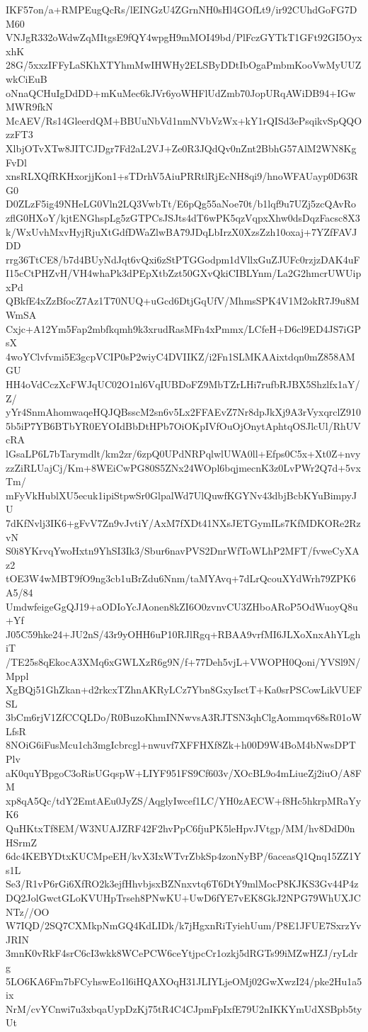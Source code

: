 IKF57on/a+RMPEugQcRs/lEINGzU4ZGrnNH0sHl4GOfLt9/ir92CUhdGoFG7DM60
VNJgR332oWdwZqMItgsE9fQY4wpgH9mMOI49bd/PlFczGYTkT1GFt92GI5OyxxhK
28G/5xxzIFFyLaSKhXTYhmMwIHWHy2ELSByDDtIbOgaPmbmKooVwMyUUZwkCiEuB
oNnaQCHuIgDdDD+mKuMec6kJVr6yoWHFlUdZmb70JopURqAWiDB94+IGwMWR9fkN
McAEV/Rs14GleerdQM+BBUuNbVd1nmNVbVzWx+kY1rQISd3ePsqikvSpQQOzzFT3
XlbjOTvXTw8JITCJDgr7Fd2aL2VJ+Ze0R3JQdQv0nZnt2BbhG57AlM2WN8KgFvDl
xnsRLXQfRKHxorjjKon1+sTDrhV5AiuPRRtlRjEcNH8qi9/hnoWFAUayp0D63RG0
D0ZLzF5ig49NHeLG0Vln2LQ3VwbTt/E6pQg55aNoe70t/b1lqf9u7UZj5zcQAvRo
zflG0HXoY/kjtENGhspLg5zGTPCsJSJts4dT6wPK5qzVqpxXhw0dsDqzFacsc8X3
k/WxUvhMxvHyjRjuXtGdfDWaZlwBA79JDqLbIrzX0XzsZzh10oxaj+7YZfFAVJDD
rrg36TtCE8/b7d4BUyNdJqt6vQxi6zStPTGGodpm1dVllxGuZJUFc0rzjzDAK4uF
I15cCtPHZvH/VH4whaPk3dPEpXtbZzt50GXvQkiCIBLYnm/La2G2hmcrUWUipxPd
QBkfE4xZzBfocZ7Az1T70NUQ+uGcd6DtjGqUfV/MhmsSPK4V1M2okR7J9u8MWmSA
Cxjc+A12Ym5Fap2mbfkqmh9k3xrudRasMFn4xPmmx/LCfeH+D6cl9ED4JS7iGPsX
4woYClvfvmi5E3gcpVCIP0sP2wiyC4DVIIKZ/i2Fn1SLMKAAixtdqn0mZ858AMGU
HH4oVdCczXcFWJqUC02O1nl6VqIUBDoFZ9MbTZrLHi7rufbRJBX5Shzlfx1aY/Z/
yYr4SnmAhomwaqeHQJQBsscM2sn6v5Lx2FFAEvZ7Nr8dpJkXj9A3rVyxqrclZ910
5b5iP7YB6BTbYR0EYOIdBbDtHPb7OiOKpIVfOuOjOnytAphtqOSJlcUl/RhUVcRA
lGsaLP6L7bTarymdlt/km2zr/6zpQ0UPdNRPqlwlUWA0ll+Efps0C5x+Xt0Z+nvy
zzZiRLUajCj/Km+8WEiCwPG80S5ZNx24WOpl6bqjmecnK3z0LvPWr2Q7d+5vxTm/
mFyVkHublXU5ecuk1ipiStpwSr0GlpalWd7UlQuwfKGYNv43dbjBcbKYuBimpyJU
7dKfNvlj3IK6+gFvV7Zn9vJvtiY/AxM7fXDt41NXsJETGymILs7KfMDKORe2RzvN
S0i8YKrvqYwoHxtn9YhSI3Ik3/Sbur6navPVS2DnrWfToWLhP2MFT/fvweCyXAz2
tOE3W4wMBT9fO9ng3cb1uBrZdu6Nnm/taMYAvq+7dLrQcouXYdWrh79ZPK6A5/84
UmdwfeigeGgQJ19+aODIoYcJAonen8kZI6O0zvnvCU3ZHboARoP5OdWuoyQ8u+Yf
J05C59hke24+JU2nS/43r9yOHH6uP10RJlRgq+RBAA9vrfMI6JLXoXnxAhYLghiT
/TE25s8qEkocA3XMq6xGWLXzR6g9N/f+77Deh5vjL+VWOPH0Qoni/YVSl9N/Mppl
XgBQj51GhZkan+d2rkcxTZhnAKRyLCz7Ybn8GxyIsctT+Ka0srPSCowLikVUEFSL
3bCm6rjV1ZfCCQLDo/R0BuzoKhmINNwvsA3RJTSN3qhClgAommqv68sR01oWLfsR
8NOiG6iFusMcu1ch3mgIcbrcgl+nwuvf7XFFHXf8Zk+h00D9W4BoM4bNwsDPTPlv
aK0quYBpgoC3oRisUGqspW+LIYF951FS9Cf603v/XOcBL9o4mLiueZj2iuO/A8FM
xp8qA5Qc/tdY2EmtAEu0JyZS/AqglyIwcef1LC/YH0zAECW+f8Hc5hkrpMRaYyK6
QuHKtxTf8EM/W3NUAJZRF42F2hvPpC6fjuPK5leHpvJVtgp/MM/hv8DdD0nHSrmZ
6dc4KEBYDtxKUCMpeEH/kvX3IxWTvrZbkSp4zonNyBP/6aceasQ1Qnq15ZZ1Ys1L
Se3/R1vP6rGi6XfRO2k3ejfHhvbjsxBZNnxvtq6T6DtY9mlMocP8KJKS3Gv44P4z
DQ2JolGwctGLoKVUHpTrseh8PNwKU+UwD6fYE7vEK8GkJ2NPG79WhUXJCNTz//OO
W7IQD/2SQ7CXMkpNmGQ4KdLIDk/k7jHgxnRiTyiehUum/P8E1JFUE7SxrzYvJRIN
3mnK0vRkF4srC6cI3wkk8WCePCW6ceYtjpcCr1ozkj5dRGTs99iMZwHZJ/ryLdrg
5LO6KA6Fm7bFCyhswEo1l6iHQAXOqH31JLIYLjeOMj02GwXwzI24/pke2Hu1a5ix
NrM/cvYCnwi7u3xbqaUypDzKj75tR4C4CJpmFpIxfE79U2nIKKYmUdXSBpb5tyUt
